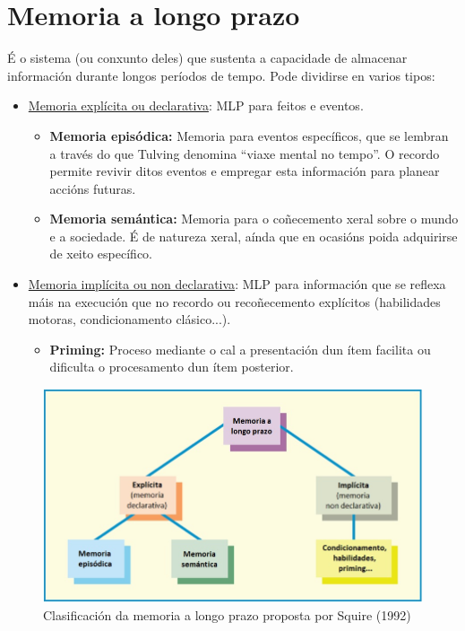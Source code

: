 \documentclass[a4paper,11pt]{article}
\begin{document}
\section{Memoria a longo prazo}
É o sistema (ou conxunto deles) que sustenta a capacidade de almacenar información durante longos períodos de tempo. Pode dividirse en varios tipos:
\begin{itemize}
	\item \underline{Memoria explícita ou declarativa}: MLP para feitos e eventos.
	\begin{itemize}
		\item \textbf{Memoria episódica:} Memoria para eventos específicos, que se lembran a través 			do que Tulving denomina ``viaxe mental no tempo''. O recordo permite revivir ditos eventos e 			empregar esta información para planear accións futuras.
		\item \textbf{Memoria semántica:} Memoria para o coñecemento xeral sobre o mundo e a 					sociedade. É de natureza xeral, aínda que en ocasións poida adquirirse de xeito específico. 
	\end{itemize}
	\item \underline{Memoria implícita ou non declarativa}: MLP para información que se reflexa máis 		na execución que no recordo ou recoñecemento explícitos (habilidades motoras, condicionamento 			clásico...).
	\begin{itemize}
		\item \textbf{Priming:} Proceso mediante o cal a presentación dun ítem facilita ou dificulta 			o procesamento dun ítem posterior.
	\end{itemize}
\end{itemize}

\begin{figure}[h!]
	\centering
	\includegraphics[width=0.9\linewidth]{memoria1_5}
	\caption{Clasificación da memoria a longo prazo proposta por Squire (1992)}
\end{figure}
\end{document}
